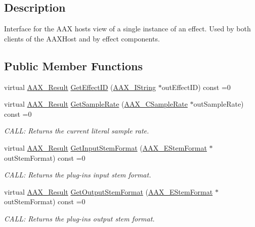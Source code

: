 \subsection{Description}
Interface for the A\+AX host\textquotesingle{}s view of a single instance of an effect. Used by both clients of the A\+A\+X\+Host and by effect components. \subsection*{Public Member Functions}
\begin{DoxyCompactItemize}
\item 
virtual \mbox{\hyperlink{a00392_a4d8f69a697df7f70c3a8e9b8ee130d2f}{A\+A\+X\+\_\+\+Result}} \mbox{\hyperlink{a01637_ae1ccab17cf8b38ab415a7f097cb7d683}{Get\+Effect\+ID}} (\mbox{\hyperlink{a01873}{A\+A\+X\+\_\+\+I\+String}} $\ast$out\+Effect\+ID) const =0
\item 
virtual \mbox{\hyperlink{a00392_a4d8f69a697df7f70c3a8e9b8ee130d2f}{A\+A\+X\+\_\+\+Result}} \mbox{\hyperlink{a01637_a434883281a90e7bfa7cfe20d941bfa9a}{Get\+Sample\+Rate}} (\mbox{\hyperlink{a00392_a3d9eea08f47e0b0a23432e15baa4e885}{A\+A\+X\+\_\+\+C\+Sample\+Rate}} $\ast$out\+Sample\+Rate) const =0
\begin{DoxyCompactList}\small\item\em C\+A\+LL\+: Returns the current literal sample rate. \end{DoxyCompactList}\item 
virtual \mbox{\hyperlink{a00392_a4d8f69a697df7f70c3a8e9b8ee130d2f}{A\+A\+X\+\_\+\+Result}} \mbox{\hyperlink{a01637_ae2bdea915b0d7165afd000deb9d4defc}{Get\+Input\+Stem\+Format}} (\mbox{\hyperlink{a00491_ad8af5ef008b2bd478add9a0acb0a1d85}{A\+A\+X\+\_\+\+E\+Stem\+Format}} $\ast$out\+Stem\+Format) const =0
\begin{DoxyCompactList}\small\item\em C\+A\+LL\+: Returns the plug-\/in\textquotesingle{}s input stem format. \end{DoxyCompactList}\item 
virtual \mbox{\hyperlink{a00392_a4d8f69a697df7f70c3a8e9b8ee130d2f}{A\+A\+X\+\_\+\+Result}} \mbox{\hyperlink{a01637_a7d2a011577cf27d9e79f7537aa279bcb}{Get\+Output\+Stem\+Format}} (\mbox{\hyperlink{a00491_ad8af5ef008b2bd478add9a0acb0a1d85}{A\+A\+X\+\_\+\+E\+Stem\+Format}} $\ast$out\+Stem\+Format) const =0
\begin{DoxyCompactList}\small\item\em C\+A\+LL\+: Returns the plug-\/in\textquotesingle{}s output stem format. \end{DoxyCompactList}\item 

\end{DoxyCompactItemize}
